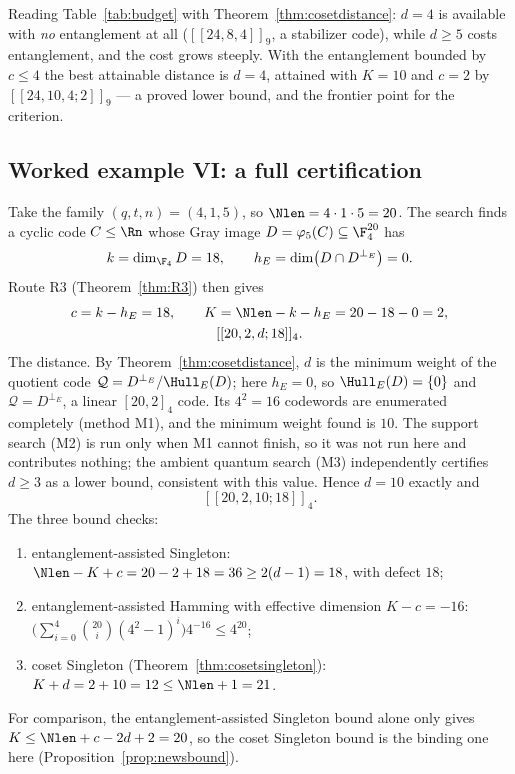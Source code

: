 Reading Table~\ref{tab:budget} with Theorem~\ref{thm:cosetdistance}: $d=4$ is
available with \emph{no} entanglement at all ($[[24,8,4]]_9$, a stabilizer
code), while $d\ge5$ costs entanglement, and the cost grows steeply. With the
entanglement bounded by $c\le4$ the best attainable distance is $d=4$, attained
with $K=10$ and $c=2$ by $[[24,10,4;2]]_9$ --- a proved lower bound, and the
frontier point for the criterion.

\subsection{Worked example VI: a full certification}

\begin{example}\label{ex:certify}
Take the family $(q,t,n)=(4,1,5)$, so $\Nlen=4\cdot1\cdot5=20$. The search
finds a cyclic code $C\le\Rn$ whose Gray image $D=\varphi_5(C)\subseteq
\F_4^{20}$ has
\[
  k=\dim_{\F_4}D=18,\qquad h_E=\dim\bigl(D\cap D^{\perp_E}\bigr)=0 .
\]
Route R3 (Theorem~\ref{thm:R3}) then gives
\[
  \begin{gathered}
    c=k-h_E=18,\qquad K=\Nlen-k-h_E=20-18-0=2,\\
    [[20,2,d;18]]_4 .
  \end{gathered}
\]
The distance. By Theorem~\ref{thm:cosetdistance}, $d$ is the minimum weight of
the quotient code $\mathcal Q=D^{\perp_E}/\Hull_E(D)$; here $h_E=0$, so
$\Hull_E(D)=\{0\}$ and $\mathcal Q=D^{\perp_E}$, a linear $[20,2]_4$ code. Its
$4^2=16$ codewords are enumerated completely (method M1), and the minimum
weight found is $10$. The support search (M2) is run only when M1 cannot
finish, so it was not run here and contributes nothing; the ambient quantum
search (M3) independently certifies $d\ge3$ as a lower bound, consistent with
this value. Hence $d=10$ exactly and
\[
  [[20,2,10;18]]_4 .
\]
The three bound checks:
\begin{enumerate}[label=\textnormal{(\roman*)},leftmargin=*]
\item entanglement-assisted Singleton:
  $\Nlen-K+c=20-2+18=36\ge2(d-1)=18$, with defect $18$;
\item entanglement-assisted Hamming with effective dimension $K-c=-16$:
  $\bigl(\sum_{i=0}^{4}\binom{20}{i}(4^2-1)^i\bigr)4^{-16}\le4^{20}$;
\item coset Singleton (Theorem~\ref{thm:cosetsingleton}):
  $K+d=2+10=12\le\Nlen+1=21$.
\end{enumerate}
For comparison, the entanglement-assisted Singleton bound alone only gives
$K\le\Nlen+c-2d+2=20$, so the coset Singleton bound is the binding one here
(Proposition~\ref{prop:newsbound}).


\end{example}
